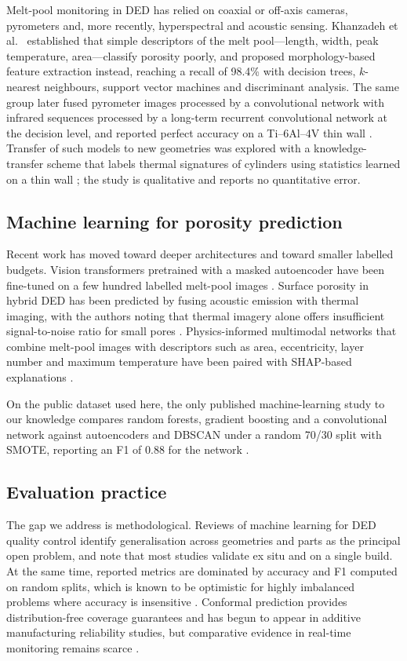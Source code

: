\documentclass[preprint,12pt]{elsarticle}
\begin{document}
Melt-pool monitoring in DED has relied on coaxial or off-axis cameras, pyrometers and, more recently, hyperspectral and acoustic sensing. Khanzadeh et al.\ \cite{khanzadeh2018} established that simple descriptors of the melt pool---length, width, peak temperature, area---classify porosity poorly, and proposed morphology-based feature extraction instead, reaching a recall of 98.4\% with decision trees, $k$-nearest neighbours, support vector machines and discriminant analysis. The same group later fused pyrometer images processed by a convolutional network with infrared sequences processed by a long-term recurrent convolutional network at the decision level, and reported perfect accuracy on a Ti--6Al--4V thin wall \cite{tian2020}. Transfer of such models to new geometries was explored with a knowledge-transfer scheme that labels thermal signatures of cylinders using statistics learned on a thin wall \cite{guo2023}; the study is qualitative and reports no quantitative error.

\subsection{Machine learning for porosity prediction}

Recent work has moved toward deeper architectures and toward smaller labelled budgets. Vision transformers pretrained with a masked autoencoder have been fine-tuned on a few hundred labelled melt-pool images \cite{era2025}. Surface porosity in hybrid DED has been predicted by fusing acoustic emission with thermal imaging, with the authors noting that thermal imagery alone offers insufficient signal-to-noise ratio for small pores \cite{farea2025}. Physics-informed multimodal networks that combine melt-pool images with descriptors such as area, eccentricity, layer number and maximum temperature have been paired with SHAP-based explanations \cite{gawade2025}.

On the public dataset used here, the only published machine-learning study to our knowledge compares random forests, gradient boosting and a convolutional network against autoencoders and DBSCAN under a random 70/30 split with SMOTE, reporting an F1 of 0.88 for the network \cite{ayyildizli2025}.

\subsection{Evaluation practice}

The gap we address is methodological. Reviews of machine learning for DED quality control identify generalisation across geometries and parts as the principal open problem, and note that most studies validate ex situ and on a single build. At the same time, reported metrics are dominated by accuracy and F1 computed on random splits, which is known to be optimistic for highly imbalanced problems where accuracy is insensitive \cite{saito2015}. Conformal prediction provides distribution-free coverage guarantees and has begun to appear in additive manufacturing reliability studies, but comparative evidence in real-time monitoring remains scarce \cite{angelopoulos2023}.
\end{document}
